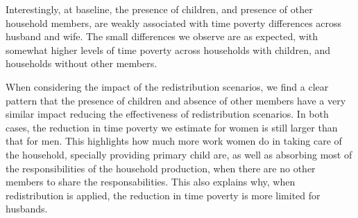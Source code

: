 \documentclass[
  11pt,
]{article}
\begin{document}
Interestingly, at baseline, the presence of children, and presence of
other household members, are weakly associated with time poverty
differences across husband and wife. The small differences we observe
are as expected, with somewhat higher levels of time poverty across
households with children, and households without other members.

\begin{table}

\caption{\label{tbl-tb3}Time Poverty by Household Structure}


\end{table}%

When considering the impact of the redistribution scenarios, we find a
clear pattern that the presence of children and absence of other members
have a very similar impact reducing the effectiveness of redistribution
scenarios. In both cases, the reduction in time poverty we estimate for
women is still larger than that for men. This highlights how much more
work women do in taking care of the household, specially providing
primary child are, as well as absorbing most of the responsibilities of
the household production, when there are no other members to share the
responsabilities. This also explains why, when redistribution is
applied, the reduction in time poverty is more limited for husbands.
\end{document}
